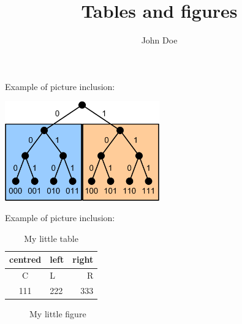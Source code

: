 \documentclass[12pt]{article}
\title{Tables and figures}
\author{John Doe}
\begin{document}
\maketitle

Example of picture inclusion:
\begin{center}
	\includegraphics[width=0.5\textwidth]{tree}
\end{center}


Example of picture inclusion:
\begin{center}
\end{center}


\begin{table}[ht]
	\caption{My little table}
	\begin{center}
		\begin{tabular}{clr} \hline
			centred & left & right \\ \hline\hline
			C & L & R \\
			111 & 222 & 333 \\ \hline
		\end{tabular}
	\end{center}
\end{table}


\begin{figure}[ht]
	\begin{center}
	\end{center}
	\caption{My little figure}
\end{figure}
\end{document}

